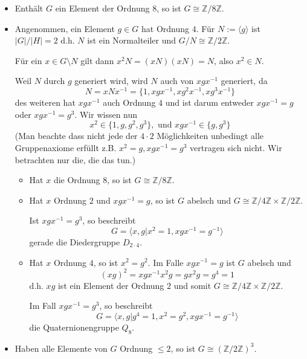 \begin{itemize}
  \item Enthält $G$ ein Element der Ordnung $8$, so ist $G \cong \mathbb{Z}/8 \mathbb{Z}$.
  \item Angenommen, ein Element $g\in G$ hat Ordnung $4$. 
    Für $N := \langle g\rangle$ ist $|G|/|H| = 2$ d.h. $N$ ist ein Normalteiler und $G/N \cong \mathbb{Z}/2 \mathbb{Z}$.

    Für ein $x \in G \setminus N$ gilt dann $x^{2}N = (xN)(xN) = N$, also $x^{2} \in N$.

    Weil $N$ durch $g$ generiert wird, wird $N$ auch von $xgx^{-1}$ generiert, da
    $$
    N = xNx^{-1} = \{1,xgx^{-1},xg^{2}x^{-1},xg^{3}x^{-1}\}
    $$
    des weiteren hat $xgx^{-1}$ auch Ordnung $4$ und ist darum entweder $xgx^{-1} = g$ oder $xgx^{-1} = g^{3}$.
    Wir wissen nun
    $$
    x^{2} \in \{1,g,g^{2},g^{3}\}, \text{ und } xgx^{-1} \in \{g, g^{3}\}
    $$
    (Man beachte dass nicht jede der $4 \cdot 2$ Möglichkeiten unbedingt alle Gruppenaxiome erfüllt z.B. $x^{2} = g, xgx^{-1} = g^{3}$ vertragen sich nicht. Wir betrachten nur die, die das tun.)
    \begin{itemize}
      \item Hat $x$ die Ordnung $8$, so ist $G \cong \mathbb{Z}/8 \mathbb{Z}$.
      \item Hat $x$ Ordnung $2$ und $xgx^{-1} = g$, so ist $G$ abelsch und $G \cong \mathbb{Z}/4 \mathbb{Z} \times \mathbb{Z}/2 \mathbb{Z}$.

        Ist $xgx^{-1} = g^{3}$, so beschreibt
        $$
        G = \langle x,g \big\vert x^{2} = 1, xgx^{-1} = g^{-1}\rangle
        $$
        gerade die Diedergruppe $D_{2 \cdot 4}$.

         \item Hat $x$ Ordnung $4$, so ist $x^{2} = g^{2}$.
           Im Falle $xgx^{-1} = g$ ist $G$ abelsch und
           $$(xg)^{2} = xgx^{-1} x^{2}g = gx^{2}g = g^{4} = 1
           $$
           d.h. $xg$ ist ein Element der Ordnung $2$ und somit $G \cong \mathbb{Z}/4 \mathbb{Z} \times \mathbb{Z}/2 \mathbb{Z}$.

           Im Fall $xgx^{-1} = g^{3}$, so beschreibt
           $$
           G = \langle x,g \big\vert g^{4} = 1, x^{2} = g^{2}, xgx^{-1} = g^{-1}\rangle
           $$
           die Quaternionengruppe $Q_8$.

    \end{itemize}

  \item Haben alle Elemente von $G$ Ordnung $\leq 2$, so ist $G \cong (\mathbb{Z}/2 \mathbb{Z})^{3}$.
\end{itemize}


